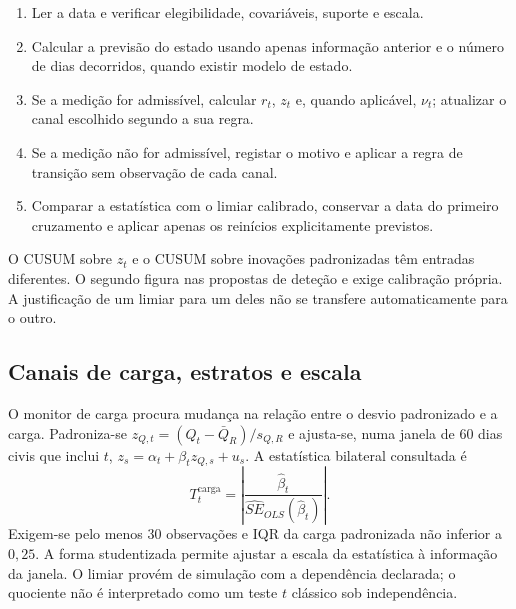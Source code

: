 \begin{tcolorbox}[breakable,colback=black!2,colframe=black!45,title={Algoritmo G.2 --- Atualização de um monitor}]
\begin{enumerate}[leftmargin=*,nosep]
\item Ler a data e verificar elegibilidade, covariáveis, suporte e escala.
\item Calcular a previsão do estado usando apenas informação anterior e o número de dias decorridos, quando existir modelo de estado.
\item Se a medição for admissível, calcular $r_t$, $z_t$ e, quando aplicável, $\nu_t$; atualizar o canal escolhido segundo a sua regra.
\item Se a medição não for admissível, registar o motivo e aplicar a regra de transição sem observação de cada canal.
\item Comparar a estatística com o limiar calibrado, conservar a data do primeiro cruzamento e aplicar apenas os reinícios explicitamente previstos.
\end{enumerate}
\end{tcolorbox}

O CUSUM sobre $z_t$ e o CUSUM sobre inovações padronizadas têm entradas diferentes. O segundo figura nas propostas de deteção e exige calibração própria. A justificação de um limiar para um deles não se transfere automaticamente para o outro\parencite{AlwanRoberts1988,Lai1995}.

\subsection{Canais de carga, estratos e escala}
\label{sec:mat-monitores-carga-escala}
O monitor de carga procura mudança na relação entre o desvio padronizado e a carga. Padroniza-se $z_{Q,t}=(Q_t-\bar Q_R)/s_{Q,R}$ e ajusta-se, numa janela de 60 dias civis que inclui $t$, $z_s=\alpha_t+\beta_tz_{Q,s}+u_s$. A estatística bilateral consultada é
\begin{equation}
T_t^{\mathrm{carga}}=\left|\frac{\widehat\beta_t}{\widehat{SE}_{OLS}(\widehat\beta_t)}\right|.
\label{eq:mat-monitor-carga}
\end{equation}
Exigem-se pelo menos 30 observações e IQR da carga padronizada não inferior a $0{,}25$. A forma studentizada permite ajustar a escala da estatística à informação da janela. O limiar provém de simulação com a dependência declarada; o quociente não é interpretado como um teste $t$ clássico sob independência.

